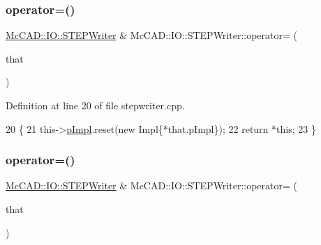 \mbox{\label{classMcCAD_1_1IO_1_1STEPWriter_ad1ce0928642a6720e0bac03b2fca5ed1}} 
\subsubsection{\texorpdfstring{operator=()}{operator=()}\hspace{0.1cm}{\footnotesize\ttfamily [2/4]}}
{\footnotesize\ttfamily \hyperlink{classMcCAD_1_1IO_1_1STEPWriter}{Mc\+C\+A\+D\+::\+I\+O\+::\+S\+T\+E\+P\+Writer} \& Mc\+C\+A\+D\+::\+I\+O\+::\+S\+T\+E\+P\+Writer\+::operator= (\begin{DoxyParamCaption}\item[{const \hyperlink{classMcCAD_1_1IO_1_1STEPWriter}{S\+T\+E\+P\+Writer} \&}]{that }\end{DoxyParamCaption})}



Definition at line 20 of file stepwriter.\+cpp.


\begin{DoxyCode}
20                                                   \{
21   this->\hyperlink{classMcCAD_1_1IO_1_1STEPWriter_af607286b2a18648c14ece6b8bc103db4}{pImpl}.reset(\textcolor{keyword}{new} Impl\{*that.pImpl\});
22   \textcolor{keywordflow}{return} *\textcolor{keyword}{this};
23 \}
\end{DoxyCode}
\mbox{\label{classMcCAD_1_1IO_1_1STEPWriter_a6a56e30321cc7bde325ffa4d34f64b55}} 
\subsubsection{\texorpdfstring{operator=()}{operator=()}\hspace{0.1cm}{\footnotesize\ttfamily [3/4]}}
{\footnotesize\ttfamily \hyperlink{classMcCAD_1_1IO_1_1STEPWriter}{Mc\+C\+A\+D\+::\+I\+O\+::\+S\+T\+E\+P\+Writer} \& Mc\+C\+A\+D\+::\+I\+O\+::\+S\+T\+E\+P\+Writer\+::operator= (\begin{DoxyParamCaption}\item[{\hyperlink{classMcCAD_1_1IO_1_1STEPWriter}{S\+T\+E\+P\+Writer} \&\&}]{that }\end{DoxyParamCaption})}



